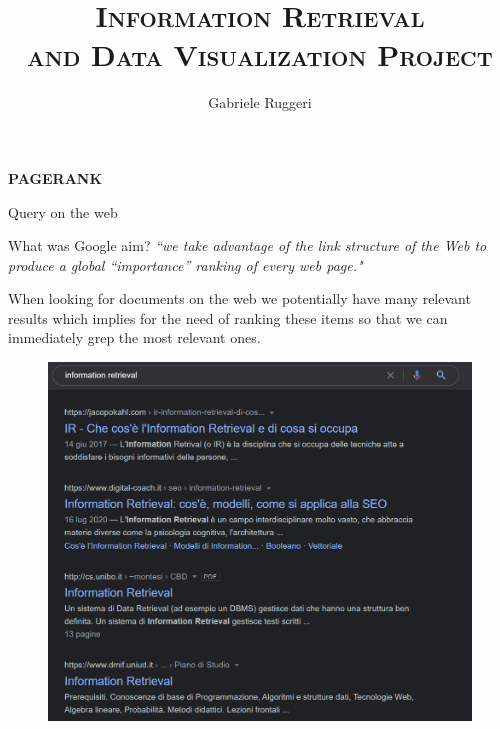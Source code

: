 \documentclass[10pt]{beamer}
\title[Information Retrieval and Data Visualization]{\LARGE{\textsc{Information Retrieval \\ and Data Visualization Project}}}
\date{}
\author{Gabriele Ruggeri}
\begin{document}
\begin{frame}
\maketitle
\vspace{-3.0cm}
\begin{center}
\Large{\textbf{\textsc{PAGERANK}}} \\

\end{center}
\end{frame}



\begin{frame}{Query on the web}

\begin{block}{What was Google aim?}
\textit{“we take advantage of the link structure of the
Web to produce a global “importance” ranking of every web
page."}
\end{block}


When looking for documents on the web we potentially have many relevant results which implies for the need of ranking these items so that we can immediately grep the most relevant ones.  

\begin{center}
\begin{figure}[h] 
\centering 
\includegraphics[scale=0.25]{ricerca}
\end{figure}
\end{center}

\end{frame}
\end{document}
